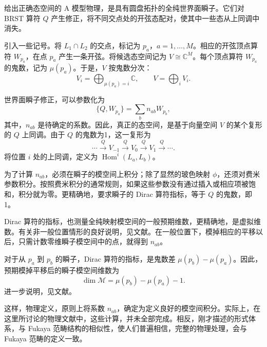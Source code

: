 给出正确态空间的 A 模型物理，是具有圆盘拓扑的全纯世界面瞬子。它们对 BRST 算符 $Q$ 产生修正，将不同交点处的开弦态配对，使其中一些态从上同调中消失。

引入一些记号。将 $L_1\cap L_2$ 的交点，标记为 $p_a$，$a=1,\ldots,M$。相应的开弦顶点算符 $W_{p_a}$，在点 $p_a$ 产生一条开弦。将候选态空间记为 $V\cong\mathbb{C}^M$。每个顶点算符 $W_{p_a}$ 的鬼数，记为 $\mu(p_a)$。于是，$V$ 按鬼数分次：
\begin{equation}\label{eq:3.184}
V_i=\bigoplus_{\mu(p_a)=i}\mathbb{C},
\qquad V=\bigoplus_iV_i.
\end{equation}

世界面瞬子修正，可以参数化为
\begin{equation}\label{eq:3.185}
\{Q,W_{p_a}\}=\sum_b n_{ab}W_{p_b},
\end{equation}
其中，$n_{ab}$ 是待确定的系数。因此，真正的态空间，是基于向量空间 $V$ 的某个复形的 $Q$ 上同调。由于 $Q$ 的鬼数为1，这一复形为
\begin{equation}\label{eq:3.186}
\cdots\xrightarrow{Q}V_{-1}\xrightarrow{Q}V_0
\xrightarrow{Q}V_1\xrightarrow{Q}\cdots.
\end{equation}
将位置 $i$ 处的上同调，定义为 $\operatorname{Hom}^i(L_a,L_b)$。

为了计算 $n_{ab}$，必须在瞬子的模空间上积分；除了显然的玻色映射 $\phi$，还须对费米参数积分。按照费米积分的通常规则，如果这些参数没有通过插入或相应项被饱和，积分就为零。更精确地，要求瞬子的 Dirac 算符指标，等于 $Q$ 的鬼数，即1。

Dirac 算符的指标，也测量全纯映射模空间的一般预期维数，更精确地，是虚拟维数。有关非一般位置情形的良好说明，见文献。在一般位置下，模掉相应的平移以后，只需计数零维瞬子模空间中的点，就得到 $n_{ab}$。

对于从 $p_a$ 到 $p_b$ 的瞬子，Dirac 算符的指标，是鬼数差 $\mu(p_b)-\mu(p_a)$。因此，预期模掉平移后的瞬子模空间维数为
\begin{equation}\label{eq:3.187}
\dim\mathcal{M}=\mu(p_b)-\mu(p_a)-1.
\end{equation}
进一步说明，见文献。

这样，物理定义，原则上将系数 $n_{ab}$，确定为定义良好的模空间积分。实际上，在这里所讨论的物理文献中，这些计算，并未全部完成。相反，刚才描述的形式体系，与 Fukaya 范畴结构的相似性，使人们普遍相信，完整的物理处理，会与 Fukaya 范畴的定义一致。

